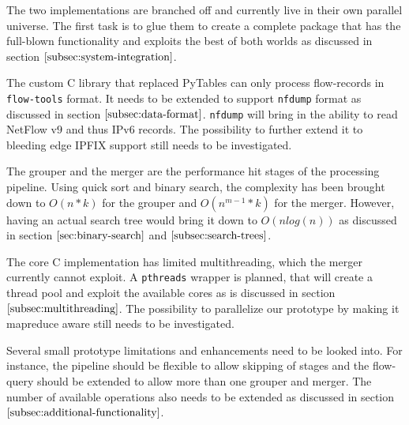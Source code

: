 The two implementations are branched off and currently live in their own
parallel universe. The first task is to glue them to create a complete package
that has the full-blown functionality and exploits the best of both worlds as
discussed in section $\ref{subsec:system-integration}$.

\vspace{10pt}

The custom C library that replaced PyTables can only process flow-records in
\texttt{flow-tools} format. It needs to be extended to support \texttt{nfdump}
format as discussed in section $\ref{subsec:data-format}$. \texttt{nfdump}
will bring in the ability to read NetFlow v$9$ and thus \ac{IP}v$6$ records.
The possibility to further extend it to bleeding edge \ac{IPFIX} support still
needs to be investigated.

\vspace{10pt}

The grouper and the merger are the performance hit stages of the processing
pipeline. Using quick sort and binary search, the complexity has been brought
down to $O(n*k)$ for the grouper and $O(n^{m-1}*k)$ for the merger. However,
having an actual search tree would bring it down to $O(nlog(n))$ as discussed
in section $\ref{sec:binary-search}$ and $\ref{subsec:search-trees}$.

\vspace{10pt}

The core C implementation has limited multithreading, which the merger
currently cannot exploit. A \texttt{pthreads} wrapper is planned, that will
create a thread pool and exploit the available cores as is discussed in
section $\ref{subsec:multithreading}$. The possibility to parallelize our
prototype by making it mapreduce aware still needs to be investigated.

\vspace{10pt}

Several small prototype limitations and enhancements need to be looked into.
For instance, the pipeline should be flexible to allow skipping of stages and
the flow-query should be extended to allow more than one grouper and merger.
The number of available operations also needs to be extended as discussed in
section $\ref{subsec:additional-functionality}$.
